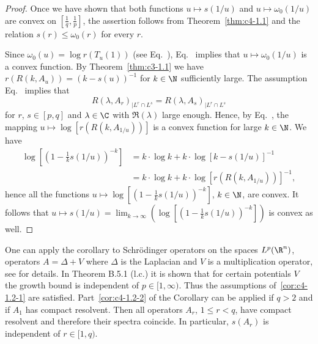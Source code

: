 \begin{proof}
Once we have shown that both functions $u \mapsto s(1/u)$ and $u \mapsto \omega_{0}(1/u)$ are convex on $[\frac{1}{q},\frac{1}{p}]$, the assertion follows from  Theorem~\ref{thm:c4-1.1} and the relation $s(r) \leq \omega_{0}(r)$ for every $r$.

Since $\omega_{0}(u) = \log r(T_{u}(1))$ (see Eq.~), Eq.~ implies that $u \mapsto \omega_0(1/u)$ is a convex function.
By Theorem~\ref{thm:c3-1.1} we have $r(R(k,A_{u})) = (k-s(u))^{-1}$ for $k \in \N$ sufficiently large.
The assumption Eq.~ implies that 
\[
R(\lambda,A_{r})_{|L^{r} \cap L^{s}} = R(\lambda,A_{s})_{|L^{r} \cap L^{s}}
\]
for $r$, $s \in [p,q]$ and $\lambda \in \C$ with $\Re(\lambda)$ large enough.
Hence, by Eq.~, the mapping  $u \mapsto \log [r(R(k,A_{1/u}))]$ is a convex function for large $k \in \N$.
We have
\begin{align*}
\log  \left[(1 - \frac{1}{k}s(1/u))^{-k}\right] &= k \cdot \log k + k \cdot \log [k - s(1/u)]^{-1} \\
&= k \cdot \log k + k \cdot \log [r(R(k,A_{1/u}))]^{-1},
\end{align*}
hence all the functions $u \mapsto \log[(1 - \frac{1}{k}s(1/u))^{-k}]$, $k \in \N$, are convex.
It follows that $u \mapsto s(1/u) = \lim_{k\to\infty}(\log [(1 - \frac{1}{k}s(1/u))^{-k}])$ is convex as well.
\end{proof}
One can apply the corollary to Schrödinger operators on the spaces $L^{p}(\R^{n})$, \ie operators $A = \Delta + V$ where $\Delta$ is the Laplacian and $V$ is a multiplication operator, see  \textcite{simon:1982} for details.
In Theorem B.5.1 (l.c.) it is shown that for certain potentials $V$ the growth bound is independent of\/ $p \in [1,\infty)$.
Thus the assumptions of~\ref{cor:c4-1.2-1} are satisfied.
Part~\ref{cor:c4-1.2-2} of the Corollary can be applied if\/ $q > 2$ and if\/ $A_{1}$ has compact resolvent.
Then all operators $A_{r}$, $1 \leq r < q$, have compact resolvent and therefore their spectra coincide.
In particular, $s(A_{r})$ is independent of\/ $r \in [1,q)$.

